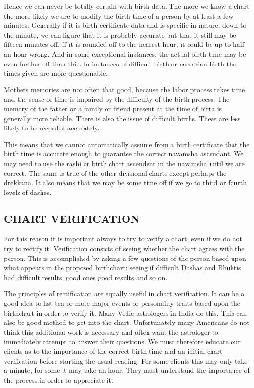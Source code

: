  

Hence we can never be totally certain with birth data. The more we know a chart the more likely we are to modify the birth time of a person by at least a few minutes.  Generally if it is birth certificate data and is specific in nature, down to the minute, we can figure that it is probably accurate but that it still may be fifteen minutes off. If it is rounded off to the nearest hour, it could be up to half an hour wrong. And in some exceptional instances, the actual birth time may be even further off than this. In instances of difficult birth or caesarian birth the times given are more questionable.

 

Mothers memories are not often that good, because the labor process takes time and the sense of time is impaired by the difficulty of the birth process. The memory of the father or a family or friend present at the time of birth is generally more reliable. There is also the issue of difficult births. These are less likely to be recorded accurately.

 

This means that we cannot automatically assume from a birth certificate that the birth time is accurate enough to guarantee the correct navamsha ascendant. We may need to use the rashi or birth chart ascendent in the navamsha until we are correct. The same is true of the other divisional charts except perhaps the drekkana. It also means that we may be some time off if we go to third or fourth levels of dashes.

 

\subsection{CHART VERIFICATION}

 

For this reason it is important always to try to verify a chart, even if we do not try to rectify it. Verification consists of seeing whether the chart agrees with the person. This is accomplished by asking a few questions of the person based upon what appears in the proposed birthchart: seeing if difficult Dashas and Bhuktis had difficult results, good ones good results and so on.

 

The principles of rectification are equally useful in chart verification. It can be a good idea to list ten or more major events or personality traits based upon the birthchart in order to verify it. Many Vedic astrologers in India do this. This can also be good method to get into the chart. Unfortunately many Americans do not think this additional work is necessary and often want the astrologer to immediately attempt to answer their questions. We must therefore educate our clients as to the importance of the correct birth time and an initial chart verification before starting the usual reading. For some clients this may only take a minute, for some it may take an hour. They must understand the importance of the process in order to appreciate it.

